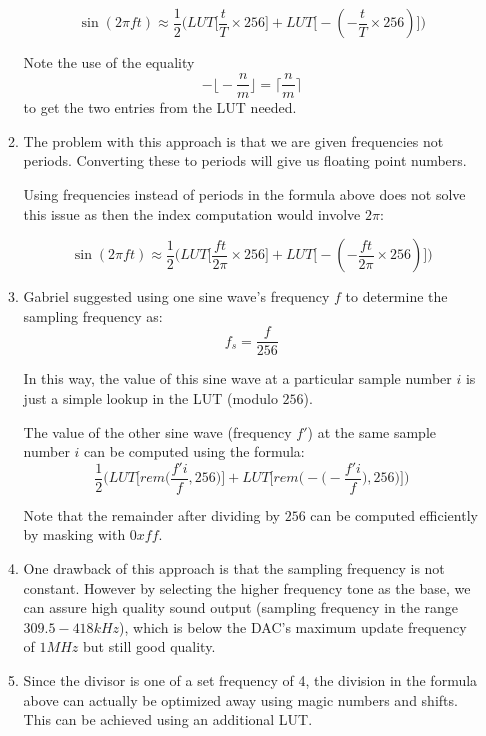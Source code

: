 \documentclass[11pt,a4paper]{scrartcl}
\begin{document}
\begin{enumerate}
\begin{enumerate}
            $$ \sin(2\pi ft) \approx \frac{1}{2}\Bigg(LUT\bigg[\frac{t}{T} \times 256\bigg] + LUT\bigg[-(-\frac{t}{T} \times 256)\bigg]\Bigg) $$

            Note the use of the equality 
            $$ -\bigg\lfloor - \frac{n}{m} \bigg\rfloor = \bigg\lceil \frac{n}{m} \bigg\rceil $$
            to get the two entries from the LUT needed.
        
        \item The problem with this approach is that we are given frequencies not periods. Converting these to periods
            will give us floating point numbers.

            Using frequencies instead of periods in the formula above does not solve this issue as then the index
            computation would involve $2\pi$:
        
            $$ \sin(2\pi ft) \approx \frac{1}{2}\Bigg(LUT\bigg[\frac{ft}{2\pi} \times 256\bigg] + LUT\bigg[-(-\frac{ft}{2\pi} \times 256)\bigg]\Bigg) $$

        \item Gabriel suggested using one sine wave's frequency $f$ to determine the sampling frequency as:
            $$ f_s = \frac{f}{256} $$

            In this way, the value of this sine wave at a particular sample number $i$ is just a simple lookup in the LUT (modulo $256$).

            The value of the other sine wave (frequency $f'$) at the same sample number $i$ can be computed using the formula:
            $$ \frac{1}{2}\Bigg(LUT\bigg[rem\bigg(\frac{f'i}{f}, 256\bigg)\bigg] + LUT\bigg[rem\bigg(-\bigg(-\frac{f'i}{f}\bigg), 256\bigg)\bigg]\Bigg) $$
            
            Note that the remainder after dividing by $256$ can be computed efficiently by masking with $0xff$.

        \item One drawback of this approach is that the sampling frequency is not constant. However by selecting the 
            higher frequency tone as the base, we can assure high quality sound output (sampling frequency in the range $309.5-418kHz$),
            which is below the DAC's maximum update frequency of $1 MHz$ but still good quality.

        \item Since the divisor is one of a set frequency of 4, the division in the formula above can actually be
            optimized away using magic numbers and shifts. This can be achieved using an additional LUT.


\end{enumerate}
\end{enumerate}
\end{document}
